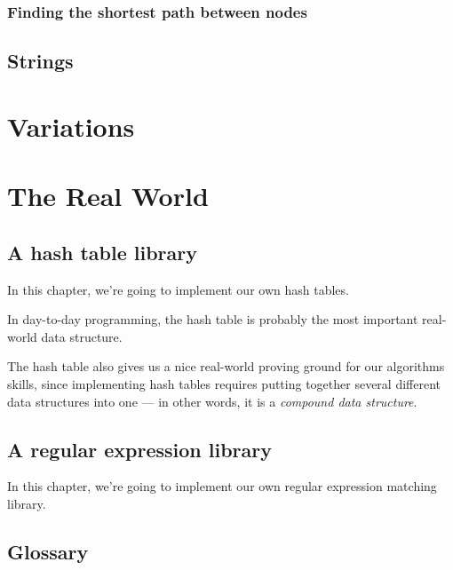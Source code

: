 \documentclass[12pt,openright,draft]{book}
\begin{document}
\section{Finding the shortest path between nodes}

\chapter{Strings}


\part{Variations}


\part{The Real World}
\chapter{A hash table library}

In this chapter, we're going to implement our own hash tables.

In day-to-day programming, the hash table is probably the most
important real-world data structure.

The hash table also gives us a nice real-world proving ground for our
algorithms skills, since implementing hash tables requires putting
together several different data structures into one --- in other
words, it is a \emph{compound data structure}.


\chapter{A regular expression library}

In this chapter, we're going to implement our own regular expression
matching library.


\chapter{Glossary}
\end{document}

